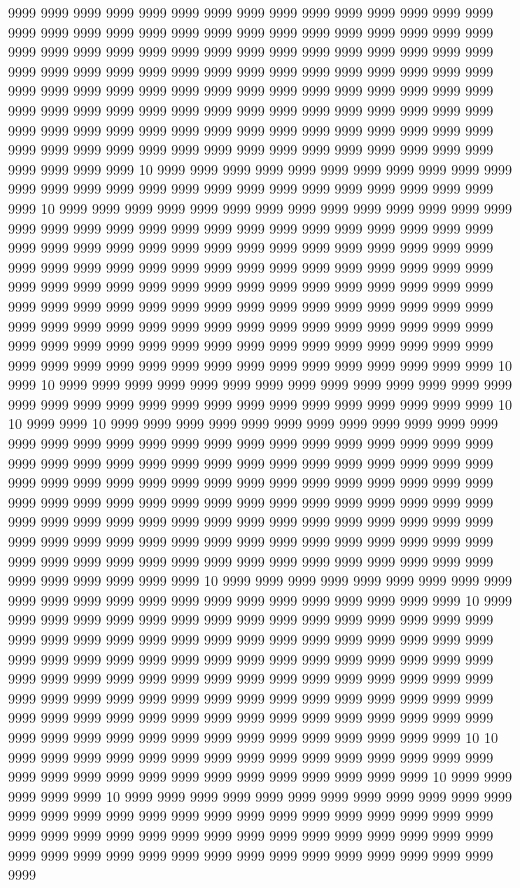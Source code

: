 9999 9999 9999 9999 9999 9999 9999 9999 9999 9999 9999 9999 9999 9999 9999 9999 9999 9999 9999 9999 9999 9999 9999 9999 9999 9999 9999 9999 9999 9999 9999 9999 9999 9999 9999 9999 9999 9999 9999 9999 9999 9999 9999 9999 9999 9999 9999 9999 9999 9999 9999 9999 9999 9999 9999 9999 9999 9999 9999 9999 9999 9999 9999 9999 9999 9999 9999 9999 9999 9999 9999 9999 9999 9999 9999 9999 9999 9999 9999 9999 9999 9999 9999 9999 9999 9999 9999 9999 9999 9999 9999 9999 9999 9999 9999 9999 9999 9999 9999 9999 9999 9999 9999 9999 9999 9999 9999 9999 9999 9999 9999 9999 9999 9999 9999 9999 9999 9999 9999 9999 9999 9999 9999 9999 10 9999 9999 9999 9999 9999 9999 9999 9999 9999 9999 9999 9999 9999 9999 9999 9999 9999 9999 9999 9999 9999 9999 9999 9999 9999 9999 9999 10 9999 9999 9999 9999 9999 9999 9999 9999 9999 9999 9999 9999 9999 9999 9999 9999 9999 9999 9999 9999 9999 9999 9999 9999 9999 9999 9999 9999 9999 9999 9999 9999 9999 9999 9999 9999 9999 9999 9999 9999 9999 9999 9999 9999 9999 9999 9999 9999 9999 9999 9999 9999 9999 9999 9999 9999 9999 9999 9999 9999 9999 9999 9999 9999 9999 9999 9999 9999 9999 9999 9999 9999 9999 9999 9999 9999 9999 9999 9999 9999 9999 9999 9999 9999 9999 9999 9999 9999 9999 9999 9999 9999 9999 9999 9999 9999 9999 9999 9999 9999 9999 9999 9999 9999 9999 9999 9999 9999 9999 9999 9999 9999 9999 9999 9999 9999 9999 9999 9999 9999 9999 9999 9999 9999 9999 9999 9999 9999 9999 9999 9999 9999 9999 9999 10 9999 10 9999 9999 9999 9999 9999 9999 9999 9999 9999 9999 9999 9999 9999 9999 9999 9999 9999 9999 9999 9999 9999 9999 9999 9999 9999 9999 9999 9999 9999 10 10 9999 9999 10 9999 9999 9999 9999 9999 9999 9999 9999 9999 9999 9999 9999 9999 9999 9999 9999 9999 9999 9999 9999 9999 9999 9999 9999 9999 9999 9999 9999 9999 9999 9999 9999 9999 9999 9999 9999 9999 9999 9999 9999 9999 9999 9999 9999 9999 9999 9999 9999 9999 9999 9999 9999 9999 9999 9999 9999 9999 9999 9999 9999 9999 9999 9999 9999 9999 9999 9999 9999 9999 9999 9999 9999 9999 9999 9999 9999 9999 9999 9999 9999 9999 9999 9999 9999 9999 9999 9999 9999 9999 9999 9999 9999 9999 9999 9999 9999 9999 9999 9999 9999 9999 9999 9999 9999 9999 9999 9999 9999 9999 9999 9999 9999 9999 9999 9999 9999 9999 9999 9999 9999 9999 9999 9999 10 9999 9999 9999 9999 9999 9999 9999 9999 9999 9999 9999 9999 9999 9999 9999 9999 9999 9999 9999 9999 9999 9999 9999 10 9999 9999 9999 9999 9999 9999 9999 9999 9999 9999 9999 9999 9999 9999 9999 9999 9999 9999 9999 9999 9999 9999 9999 9999 9999 9999 9999 9999 9999 9999 9999 9999 9999 9999 9999 9999 9999 9999 9999 9999 9999 9999 9999 9999 9999 9999 9999 9999 9999 9999 9999 9999 9999 9999 9999 9999 9999 9999 9999 9999 9999 9999 9999 9999 9999 9999 9999 9999 9999 9999 9999 9999 9999 9999 9999 9999 9999 9999 9999 9999 9999 9999 9999 9999 9999 9999 9999 9999 9999 9999 9999 9999 9999 9999 9999 9999 9999 9999 9999 9999 9999 9999 9999 9999 9999 10 10 9999 9999 9999 9999 9999 9999 9999 9999 9999 9999 9999 9999 9999 9999 9999 9999 9999 9999 9999 9999 9999 9999 9999 9999 9999 9999 9999 9999 10 9999 9999 9999 9999 9999 10 9999 9999 9999 9999 9999 9999 9999 9999 9999 9999 9999 9999 9999 9999 9999 9999 9999 9999 9999 9999 9999 9999 9999 9999 9999 9999 9999 9999 9999 9999 9999 9999 9999 9999 9999 9999 9999 9999 9999 9999 9999 9999 9999 9999 9999 9999 9999 9999 9999 9999 9999 9999 9999 9999 9999 9999 9999 9999 